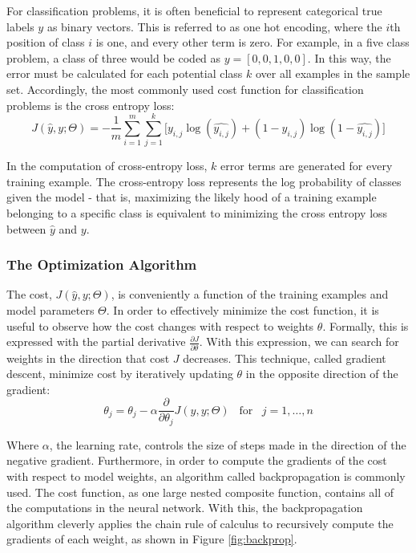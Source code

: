 For classification problems, it is often beneficial to represent categorical true labels $y$ as binary vectors. This is referred to as one hot encoding, where the $i$th position of class $i$ is one, and every other term is zero. For example, in a five class problem, a class of three would be coded as $y = [0,0,1,0,0]$. In this way, the error must be calculated for each potential class $k$ over all examples in the sample set. Accordingly, the most commonly used cost function for classification problems is the cross entropy loss:
\begin{equation} \label{eq:softmax}
    J(\hat{y}, y; \Theta) = - \frac{1}{m}\sum_{i = 1}^{m}\sum_{j = 1}^{k} \lbrack y_{i,j} \log(\hat{y_{i,j}}) + (1 - y_{i,j})\log(1 - \hat{y_{i,j}}) \rbrack
\end{equation}

In the computation of cross-entropy loss, $k$ error terms are generated for every training example. The cross-entropy loss represents the log probability of classes given the model - that is, maximizing the likely hood of a training example belonging to a specific class is equivalent to minimizing the cross entropy loss between $\hat{y}$ and $y$. 

\subsubsection{The Optimization Algorithm}
The cost, $J(\hat{y}, y; \Theta)$, is conveniently a function of the training examples and model parameters $\Theta$. In order to effectively minimize the cost function, it is useful to observe how the cost changes with respect to weights $\theta$. Formally, this is expressed with the partial derivative $\frac{\partial J}{\partial \theta}$. With this expression, we can search for weights in the direction that cost $J$ decreases. This technique, called gradient descent, minimize cost by iteratively updating $\theta$ in the opposite direction of the gradient:
\begin{equation}
    \theta_j = \theta_j - \alpha \frac{\partial}{\partial \theta_j} J(\hat{y},y;\Theta) \;\;\; \mbox{for} \;\;\; j = 1,\ldots,n
\end{equation}


Where $\alpha$, the learning rate, controls the size of steps made in the direction of the negative gradient. Furthermore, in order to compute the gradients of the cost with respect to model weights, an algorithm called backpropagation is commonly used. The cost function, as one large nested composite function, contains all of the computations in the neural network. With this, the backpropagation algorithm cleverly applies the chain rule of calculus to recursively compute the gradients of each weight, as shown in Figure \ref{fig:backprop}. 

